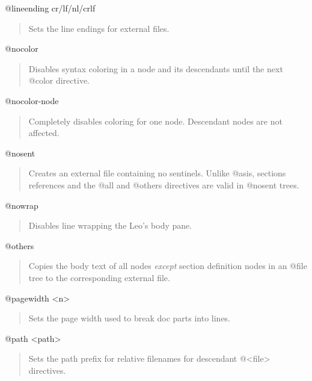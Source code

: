 \documentclass[a4paper,10pt,english]{sphinxmanual}
\begin{document}
@lineending cr/lf/nl/crlf
\begin{quote}

Sets the line endings for external files.
\end{quote}

@nocolor
\begin{quote}

Disables syntax coloring in a node and its descendants until the next @color
directive.
\end{quote}

@nocolor-node
\begin{quote}

Completely disables coloring for one node. Descendant nodes are not affected.
\end{quote}

@nosent
\begin{quote}

Creates an external file containing no sentinels. Unlike @asis, sections
references and the @all and @others directives are valid in @nosent trees.
\end{quote}

@nowrap
\begin{quote}

Disables line wrapping the Leo's body pane.
\end{quote}

@others
\begin{quote}

Copies the body text of all nodes \emph{except} section definition nodes in an
@file tree to the corresponding external file.
\end{quote}

@pagewidth \textless{}n\textgreater{}
\begin{quote}

Sets the page width used to break doc parts into lines.
\end{quote}

@path \textless{}path\textgreater{}
\begin{quote}

Sets the path prefix for relative filenames for descendant @\textless{}file\textgreater{} directives.
\end{quote}
\end{document}

